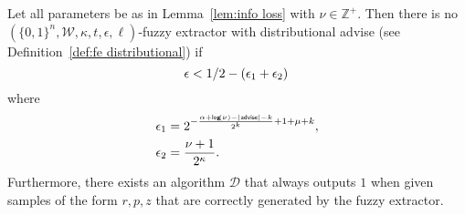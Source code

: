 \begin{lemma}
\label{lem:convert distinguisher}
Let all parameters be as in Lemma~\ref{lem:info loss} with $\nu \in\mathbb{Z}^+$.  Then there is no $(\{0,1\}^n, \mathcal{W}, \kappa, t, \epsilon, \ell)$-fuzzy extractor with distributional advise (see Definition~\ref{def:fe distributional}) if
\[
\epsilon<1/2-\left(\epsilon_1+\epsilon_2\right)\\
\]
where 
\begin{align*}
\epsilon_1&= 2^{-\frac{\alpha+\mathsf{log}\!\left(\nu\right)-|{\mathsf{advise}}|-k}{2^k}+1+\mu+k},\\
\epsilon_2&=\frac{\nu+1}{2^{\kappa}}.
\end{align*}
Furthermore, there exists an algorithm $\mathcal{D}$ that always outputs $1$ when given samples of the form $r, p, z$ that are correctly generated by the fuzzy extractor.
\end{lemma}
